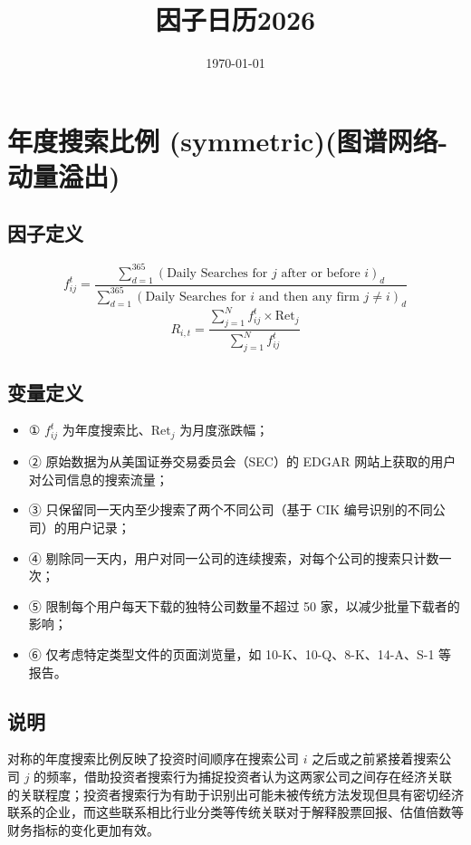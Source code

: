 \documentclass{article}
\title{因子日历2026}
\date{\today}
\begin{document}
\maketitle

\section{年度搜索比例 (symmetric)(图谱网络-动量溢出)}

\subsection{因子定义}
\begin{equation}
    f_{ij}^t = \frac{\sum_{d=1}^{365} (\text{Daily Searches for } j \text{ after or before } i)_d}{\sum_{d=1}^{365} (\text{Daily Searches for } i \text{ and then any firm } j \neq i)_d}
\end{equation}
\begin{equation}
    R_{i,t} = \frac{\sum_{j=1}^N f_{ij}^t \times \mathrm{Ret}_j}{\sum_{j=1}^N f_{ij}^t}
\end{equation}

\subsection{变量定义}
\begin{itemize}
    \item ① \( f_{ij}^t \) 为年度搜索比、\( \mathrm{Ret}_j \) 为月度涨跌幅；
    \item ② 原始数据为从美国证券交易委员会（SEC）的 EDGAR 网站上获取的用户对公司信息的搜索流量；
    \item ③ 只保留同一天内至少搜索了两个不同公司（基于 CIK 编号识别的不同公司）的用户记录；
    \item ④ 剔除同一天内，用户对同一公司的连续搜索，对每个公司的搜索只计数一次；
    \item ⑤ 限制每个用户每天下载的独特公司数量不超过 50 家，以减少批量下载者的影响；
    \item ⑥ 仅考虑特定类型文件的页面浏览量，如 10-K、10-Q、8-K、14-A、S-1 等报告。
\end{itemize}

\subsection{说明}
对称的年度搜索比例反映了投资时间顺序在搜索公司 \( i \) 之后或之前紧接着搜索公司 \( j \) 的频率，借助投资者搜索行为捕捉投资者认为这两家公司之间存在经济关联的关联程度；投资者搜索行为有助于识别出可能未被传统方法发现但具有密切经济联系的企业，而这些联系相比行业分类等传统关联对于解释股票回报、估值倍数等财务指标的变化更加有效。
\end{document}
